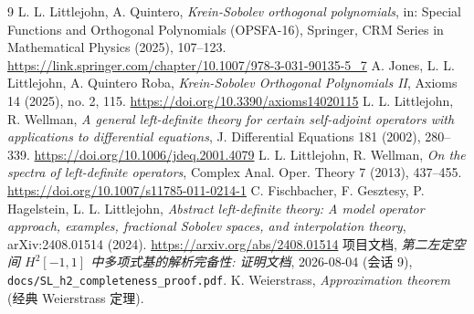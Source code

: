 \documentclass[UTF8]{ctexart}
\begin{document}
\begin{thebibliography}{9}
 L. L. Littlejohn, A. Quintero, \emph{Krein-Sobolev orthogonal
	polynomials}, in: Special Functions and Orthogonal Polynomials (OPSFA-16),
	Springer, CRM Series in Mathematical Physics (2025), 107--123.
	\url{https://link.springer.com/chapter/10.1007/978-3-031-90135-5_7}
 A. Jones, L. L. Littlejohn, A. Quintero Roba, \emph{Krein-Sobolev
	Orthogonal Polynomials II}, Axioms 14 (2025), no. 2, 115.
	\url{https://doi.org/10.3390/axioms14020115}
 L. L. Littlejohn, R. Wellman, \emph{A general left-definite theory
	for certain self-adjoint operators with applications to differential equations},
	J. Differential Equations 181 (2002), 280--339.
	\url{https://doi.org/10.1006/jdeq.2001.4079}
 L. L. Littlejohn, R. Wellman, \emph{On the spectra of left-definite
	operators}, Complex Anal. Oper. Theory 7 (2013), 437--455.
	\url{https://doi.org/10.1007/s11785-011-0214-1}
 C. Fischbacher, F. Gesztesy, P. Hagelstein, L. L. Littlejohn,
	\emph{Abstract left-definite theory: A model operator approach, examples,
	fractional Sobolev spaces, and interpolation theory}, arXiv:2408.01514 (2024).
	\url{https://arxiv.org/abs/2408.01514}
 项目文档, \emph{第二左定空间 $H^2[-1,1]$ 中多项式基的解析完备性:
	证明文档}, 2026-08-04 (会话 9), \texttt{docs/SL\_h2\_completeness\_proof.pdf}.
 K. Weierstrass, \emph{Approximation theorem} (经典 Weierstrass 定理).
\end{thebibliography}
\end{document}
